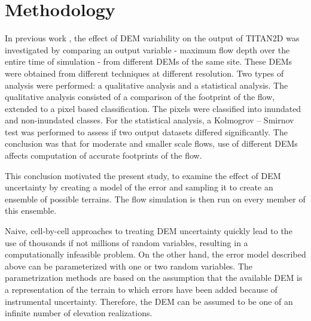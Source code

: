 \documentclass[12pt]{article}
\begin{document}
\section{Methodology}

In previous work \citep{stefanescu1}, the effect of DEM variability on
the output of TITAN2D %
was investigated by comparing an output variable - maximum flow 
depth over the entire time of simulation - from different DEMs of the same site.  These
DEMs were obtained from different techniques at different
resolution. Two types of analysis were performed: a qualitative
analysis and a statistical analysis. The qualitative analysis
consisted of a comparison of the footprint of the flow, extended to a
pixel based classification. The pixels were classified into inundated
and non-inundated classes. For the statistical analysis, a
Kolmogrov -- Smirnov test was performed to assess if two output datasets differed
significantly. The conclusion was that for moderate and smaller scale
flows, use of different DEMs affects computation of accurate
footprints of the flow.

This conclusion motivated the present study, to examine the effect of DEM
uncertainty by creating a model of the error and sampling it to create
an ensemble of possible terrains.  The flow simulation is then run on
every member of this ensemble.

Naive, cell-by-cell approaches to treating DEM uncertainty quickly
lead to the use of thousands if not millions of random variables,
resulting in a computationally infeasible problem.  On the other hand,
the error model described above can be parameterized with one or two
random variables.  The parametrization methods are based on the
assumption that the available DEM is a representation of the terrain
to which errors have been added because of instrumental uncertainty.
Therefore, the DEM can be assumed to be one of an infinite number of
elevation realizations.
\end{document}
